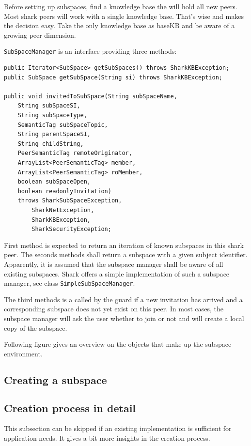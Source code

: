Before setting up subspaces, find a knowledge base the will hold all new peers.
Most shark peers will work with a single knowledge base. That's wise and makes the decision easy. Take the only knowledge base as baseKB and be aware of a growing peer dimension.

{\tt SubSpaceManager} is an interface providing three methods:

\begin{verbatim}
public Iterator<SubSpace> getSubSpaces() throws SharkKBException;
public SubSpace getSubSpace(String si) throws SharkKBException;

public void invitedToSubSpace(String subSpaceName, 
    String subSpaceSI, 
    String subSpaceType, 
    SemanticTag subSpaceTopic,
    String parentSpaceSI, 
    String childString,
    PeerSemanticTag remoteOriginator, 
    ArrayList<PeerSemanticTag> member, 
    ArrayList<PeerSemanticTag> roMember, 
    boolean subSpaceOpen, 
    boolean readonlyInvitation) 
    throws SharkSubSpaceException, 
        SharkNetException, 
        SharkKBException, 
        SharkSecurityException;
\end{verbatim}

First method is expected to return an iteration of known subspaces in this shark peer. The seconds methods shall return a subspace with a given subject identifier. Apparently, it is assumed that the subspace manager shall be aware of all existing subspaces. Shark offers a simple implementation of such a subspace manager, see class {\tt SimpleSubSpaceManager}.

The third methods is a called by the guard if a new invitation has arrived and a corresponding subspace does not yet exist on this peer. In most cases, the subspace manager will ask the user whether to join or not and will create a local copy of the subspace.

Following figure gives an overview on the objects that make up the subspace environment.


\subsection{Creating a subspace}

\subsection{Creation process in detail}
This subsection can be skipped if an existing implementation is sufficient for application needs. It gives a bit more insights in the creation process.

